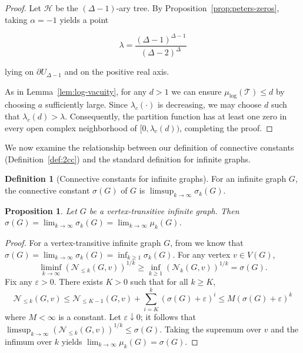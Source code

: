 \documentclass[a4paper,11pt]{article}
\theoremstyle{plain}
\newtheorem{proposition}[theorem]{Proposition}
\theoremstyle{definition}
\newtheorem{definition}[theorem]{Definition}
\theoremstyle{remark}
\newcommand{\1}{\mathbf{1}}
\begin{document}
\begin{proof}
    Let $\mathcal{H}$ be the $(\Delta-1)$-ary tree. By Proposition~\ref{prop:peters-zeros}, taking $\alpha=-1$ yields a point

    $$\lambda=\frac{(\Delta-1)^{\Delta-1}}{(\Delta-2)^\Delta}$$

    lying on \(\partial U_{\Delta-1}\) and on the positive real axis.

    As in Lemma~\ref{lem:log-vacuity}, for any $d>1$ we can ensure $\mu_{\log}(\mathcal{T})\le d$ by choosing $a$ sufficiently large. Since $\lambda_c(\cdot)$ is decreasing, we may choose $d$ such that $\lambda_c(d)>\lambda$. Consequently, the partition function has at least one zero in every open complex neighborhood of $[0,\lambda_c(d))$, completing the proof.
\end{proof}


We now examine the relationship between our definition of connective constants (Definition~\ref{def:2cc}) and the standard definition for infinite graphs.



\begin{definition}[Connective constants for infinite graphs]
    \label{pro:cc}
    For an infinite graph $G$, the connective constant $\sigma(G)$ of $G$ is $\limsup_{k\rightarrow\infty}\sigma_k(G)$.
\end{definition}

\begin{proposition}
Let $G$ be a vertex-transitive infinite graph. Then $\sigma(G)=\lim_{k\rightarrow\infty}\sigma_k(G)=\lim_{k\rightarrow\infty}\mu_k(G)$.
\end{proposition}

\begin{proof}
    For a vertex-transitive infinite graph $G$, from \cite{grimmett2015bounds} we know that $\sigma(G)=\lim_{k\rightarrow\infty}\sigma_k(G)=\inf_{k\ge 1}\sigma_k(G)$.
    For any vertex $v\in V(G)$, $$\liminf_{k\to\infty}(\mathcal{N}_{\leq k}(G,v))^{1/k}\ge\inf_{k\ge1}(\mathcal{N}_{k}(G,v))^{1/k}=\sigma(G).$$ Fix any $\varepsilon>0$. There exists $K>0$ such that for all $k\ge K$,
    $$\mathcal{N}_{\leq k}(G,v)\le\mathcal{N}_{\leq K-1}(G,v)+\sum^k_{i=K}(\sigma(G)+\varepsilon)^i\le M(\sigma(G)+\varepsilon)^k$$
    where $M<\infty$ is a constant. Let $\varepsilon\downarrow0$; it follows that $\limsup_{k\to\infty}(\mathcal{N}_{\leq k}(G,v))^{1/k}\le\sigma(G)$. Taking the supremum over $v$ and the infimum over $k$ yields $\lim_{k\rightarrow\infty}\mu_k(G)=\sigma(G)$.
\end{proof}
\end{document}
